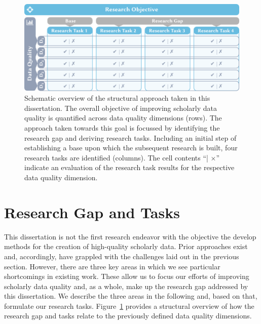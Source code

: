 
\begin{figure}[h]
  \centering
  \includegraphics[width=\linewidth]{figures/introduction/objective_dq_grid}
  \caption[Schematic overview of the structural approach taken in this dissertation]{Schematic overview of the structural approach taken in this dissertation. The overall objective of improving scholarly data quality is quantified across data quality dimensions (rows). The approach taken towards this goal is focussed by identifying the research gap and deriving research tasks. Including an initial step of establishing a base upon which the subsequent research is built, four research tasks are identified (columns). The cell contents ``\checkmark | $\times$'' indicate an evaluation of the research task results for the respective data quality dimension.}
  \label{fig:introduction-obj-dq-grid}
\end{figure}

\section{Research Gap and Tasks}\label{sec:intro-gap}


This dissertation is not the first research endeavor with the objective the develop methods for the creation of high-quality scholarly data. Prior approaches exist and, accordingly, have grappled with the challenges laid out in the previous section.
However, there are three key areas in which we see particular shortcomings in existing work. These allow us to focus our efforts of improving scholarly data quality and, as a whole, make up the research gap addressed by this dissertation.
We describe the three areas in the following and, based on that, formulate our research tasks. Figure~\ref{fig:introduction-obj-dq-grid} provides a structural overview of how the research gap and tasks relate to the previously defined data quality dimensions.

